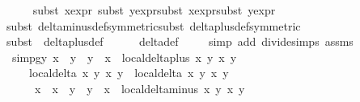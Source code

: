 \begin{isabellebody}
\ \ \ \ \isamarkupfalse%
{\isacharparenleft}{\isacharparenleft}subst\ x{}{\isacharprime}{\isacharunderscore}expr{\isacharparenright}{\isacharplus}{\isacharcomma}\ {\isacharparenleft}subst\ y{}{\isacharprime}{\isacharunderscore}expr{\isacharparenright}{\isacharplus}{\isacharcomma}{\isacharparenleft}subst\ x{}{\isacharprime}{\isacharunderscore}expr{\isacharparenright}{\isacharplus}{\isacharcomma}{\isacharparenleft}subst\ y{}{\isacharprime}{\isacharunderscore}expr{\isacharparenright}{\isacharplus}{\isacharparenright}\isanewline
\ \ \ \ \isamarkupfalse%
{\isacharparenleft}{\isacharparenleft}subst\ delta{\isacharunderscore}minus{\isacharunderscore}def{\isacharbrackleft}symmetric{\isacharbrackright}{\isacharparenright}{\isacharplus}{\isacharcomma}{\isacharparenleft}subst\ delta{\isacharunderscore}plus{\isacharunderscore}def{\isacharbrackleft}symmetric{\isacharbrackright}{\isacharparenright}{\isacharplus}{\isacharparenright}\isanewline
\ \ \ \ \isamarkupfalse%
{\isacharparenleft}subst\ {\isacharparenleft}{}{\isacharparenright}\ delta{\isacharunderscore}plus{\isacharunderscore}def{\isacharparenright}\isanewline
\ \ \ \ \isamarkupfalse%
\ delta{\isacharunderscore}def\isanewline
\ \ \ \ \isamarkupfalse%
{\isacharparenleft}simp\ add{\isacharcolon}\ divide{\isacharunderscore}simps\ assms{\isacharparenleft}{}{\isacharminus}{}{\isacharparenright}{\isacharparenright}\isanewline
\isanewline
\ \ \isamarkupfalse%
\ simp{}gy{\isacharcolon}\ {\isachardoublequoteopen}{\isacharparenleft}x{}\ {\isacharasterisk}\ y{}{\isacharprime}\ {\isacharplus}\ y{}\ {\isacharasterisk}\ x{}{\isacharprime}{\isacharparenright}\ {\isacharasterisk}\ local{\isachardot}delta{\isacharunderscore}plus\ x{}{\isacharprime}\ y{}{\isacharprime}\ x{}\ y{}\ {\isacharasterisk}\isanewline
\ \ \ \ {\isacharparenleft}local{\isachardot}delta\ x{}\ y{}\ x{}\ y{}\ {\isacharasterisk}\ local{\isachardot}delta\ x{}\ y{}\ x{}\ y{}{\isacharparenright}\ {\isacharequal}\ \isanewline
\ \ \ \ \ {\isacharparenleft}x{}\ {\isacharasterisk}\ {\isacharparenleft}x{}\ {\isacharasterisk}\ y{}\ {\isacharplus}\ y{}\ {\isacharasterisk}\ x{}{\isacharparenright}\ {\isacharasterisk}\ local{\isachardot}delta{\isacharunderscore}minus\ x{}\ y{}\ x{}\ y{}\ {\isacharplus}\isanewline

\end{isabellebody}
